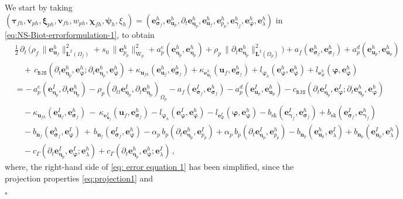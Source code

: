 \documentclass[11pt]{article}
\numberwithin{equation}{section}
\newcommand{\ds}{\displaystyle}
\newcommand{\bgamma}{{\boldsymbol\gamma}}
\newcommand{\bbeta}{{\boldsymbol\eta}}
\newcommand{\bsi}{{\boldsymbol\sigma}}
\newcommand{\bvarphi}{{\boldsymbol\varphi}}
\newcommand{\bpsi}{{\boldsymbol\psi}}
\newcommand{\btau}{{\boldsymbol\tau}}
\newcommand{\bchi}{{\boldsymbol\chi}}
\newcommand{\bxi}{{\boldsymbol\xi}}
\newcommand{\bv}{{\mathbf{v}}}
\newcommand{\bu}{\mathbf{u}}
\newcommand{\bn}{{\mathbf{n}}}
\newcommand{\be}{{\mathbf{e}}}
\newcommand{\0}{{\mathbf{0}}}
\newcommand{\bL}{\mathbf{L}}
\def\W{\mathrm{W}}
\def\BJS{\mathtt{BJS}}
\def\sk{\mathrm{sk}}
\newenvironment{proof}{\noindent{\it Proof.}}{\hfill$\square$}
\numberwithin{equation}{section}
\begin{document}
\begin{proof}
We start by taking $(\btau_{fh}, \bv_{ph}, \bxi_{ph}, \bv_{fh}, w_{ph}, \bchi_{fh}, \bpsi_{h}, \xi_{h}) = (\be_{\bsi_f}^h, \be_{\bu_p}^h, \partial_t\be_{\bbeta_p}^h, \be_{\bu_f}^h, \be_{p_p}^h, \be_{\bgamma_f}^h, \be_{\bvarphi}^h, \be_{\lambda}^h)$ in \eqref{eq:NS-Biot-errorformulation-1}, to obtain
\begin{align}\label{eq: error equation 1}
&\ds\frac{1}{2}\,\partial_t\,\Big( \rho_f\,\|\be_{\bu_f}^h\|^2_{\bL^2(\Omega_f)} 
+ s_0\,\|\be_{p_p}^h\|^2_{\W_p} 
+ a^e_p(\be_{\bbeta_p}^h,\be_{\bbeta_p}^h) 
+ \rho_p\,\|\partial_{t}\be_{\bbeta_p}^h\|^2_{\bL^2(\Omega_p)} \Big) 
+ a_f(\be_{\bsi_f}^h,\be_{\bsi_f}^h) 
+ a^d_p(\be_{\bu_p}^h,\be_{\bu_p}^h) \nonumber \\[1ex]
&\ds\quad +\, c_{\BJS}(\partial_t\be_{\bbeta_p}^h, \be_{\bvarphi}^h;\partial_t\be_{\bbeta_p}^h, \be_{\bvarphi}^h)
+ \kappa_{\bu_{fh}}(\be_{\bu_{f}}^h, \be_{\bsi_f}^h)
+ \kappa_{\be_{\bu_{f}}^h}(\bu_{f}, \be_{\bsi_f}^h)
+ l_{\bvarphi_h}(\be_{\bvarphi}^h,\be_{\bvarphi}^h) 
+ l_{\be_{\bvarphi}^h}(\bvarphi,\be_{\bvarphi}^h)\nonumber \\[1ex]
&\ds = -\,  a^e_p(\be_{\bbeta_p}^I,\partial_t\be_{\bbeta_p}^h) 
-\rho_p(\partial_{tt}\be_{\bbeta_p}^I,\partial_{t}\be_{\bbeta_p}^h)_{\Omega_p}
- a_f(\be_{\bsi_f}^I,\be_{\bsi_f}^h) 
- a^d_p(\be_{\bu_p}^I,\be_{\bu_p}^h) 
- c_{\BJS}(\partial_t\be_{\bbeta_p}^I, \be_{\bvarphi}^I;\partial_t\be_{\bbeta_p}^h, \be_{\bvarphi}^h) \nonumber \\[1ex]
&\ds\quad- \kappa_{\bu_{fh}}(\be_{\bu_{f}}^I, \be_{\bsi_f}^h)
\, -\, \kappa_{\be_{\bu_{f}}^I}(\bu_{f}, \be_{\bsi_f}^h) 
- l_{\bvarphi_h}(\be_{\bvarphi}^I,\be_{\bvarphi}^h) 
- l_{\be_{\bvarphi}^I}(\bvarphi,\be_{\bvarphi}^h) 
- b_\sk(\be_{\bgamma_f}^I,\be_{\bsi_f}^h) 
+ b_\sk(\be_{\bsi_f}^I,\be_{\bgamma_f}^h) \nonumber \\[1ex]
&\ds\quad - b_{\bn_f}(\be_{\bsi_f}^h,\be_{\bvarphi}^I)
\, +\, b_{\bn_f}(\be_{\bsi_f}^I,\be_{\bvarphi}^h)
- \alpha_p\,b_p(\partial_t\be_{\bbeta_p}^h,\be_{p_p}^I) 
+ \alpha_p\,b_p(\partial_t\be_{\bbeta_p}^I,\be_{p_p}^h) 
- b_{\bn_p}(\be_{\bu_p}^h, \be_{\lambda}^I) 
+ b_{\bn_p}(\be_{\bu_p}^I, \be_{\lambda}^h) \nonumber \\[1ex]
&\ds \quad - c_{\Gamma}(\partial_t\be_{\bbeta_p}^I,\be_{\bvarphi}^I;\be_{\lambda}^h) 
+ c_{\Gamma}(\partial_t\be_{\bbeta_p}^h,\be_{\bvarphi}^h;\be_{\lambda}^I)\,,
\end{align}
where, the right-hand side of \eqref{eq: error equation 1} has been simplified, 
since the projection properties \eqref{eq:projection1} and 

\end{proof}
\end{document}
